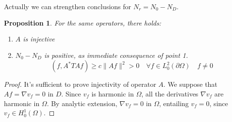 \documentclass[10pt, a4paper, twoside, openright]{book}
\theoremstyle{definition}
\theoremstyle{plain}
\theoremstyle{plain}
\theoremstyle{plain}
\newtheorem{proposition}[subsection]{Proposition}
\theoremstyle{plain}
\theoremstyle{plain}
\theoremstyle{plain}
\theoremstyle{plain}
\theoremstyle{plain}
\begin{document}
Actually we can strengthen conclusions for ${N_r} = {N_0} - {N_D}$.
\begin{proposition}
For the same operators, there holds:
\begin{enumerate}
 \item $A$ is injective
 \item ${N_0} -{N_D}$ is positive, as immediate consequence of point 1.
  \begin{equation}
   (f,A^*TAf)\geq c\|Af\|^2 > 0\quad \forall f \in L^2_0(\partial \Omega)\quad f\neq 0
  \end{equation}
\end{enumerate}
\end{proposition}
\begin{proof}
It's sufficient to prove injectivity of operator $A$. We suppose that $Af=\nabla v_f = 0$ in $D$.
Since $v_f$ is harmonic in $\Omega$, all the derivatives $\nabla v_f$ are harmonic in $\Omega$.
By analytic extension, $\nabla v_f = 0$ in $\Omega$, entailing $v_f=0$, since $v_f\in H^1_0(\Omega)$.
\end{proof}
\end{document}
